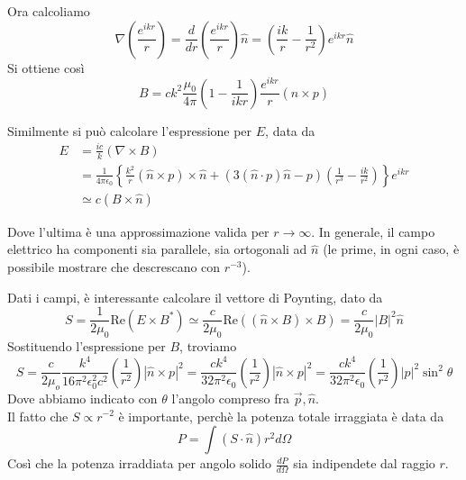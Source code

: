 \documentclass{report}
\begin{document}
            Ora calcoliamo 
            \begin{equation}
                \nabla\left(\frac{e^{ikr}}{r} \right) = \frac{d}{dr}\left(\frac{e^{ikr}}{r} \right)\hat{n} = \left(\frac{ik}{r} - \frac{1}{r^2} \right)e^{ikr}\hat{n}
            \end{equation}
            Si ottiene così 
            \begin{equation}
                B = ck^2 \frac{\mu_0}{4\pi}\left(1 - \frac{1}{ikr} \right)\frac{e^{ikr}}{r}(\hat{n}\times p )
            \end{equation}

            Similmente si può calcolare l'espressione per $E$, data da 
            \begin{align}
                E &= \frac{ic}{k}(\nabla \times B) \\
                &= \frac{1}{4\pi\epsilon_0}\left\{\frac{k^2}{r}(\hat {n}\times p) \times \hat{n} + (3(\hat{n}\cdot p)\hat{n}-p)\left(\frac{1}{r^3}- \frac{ik}{r^2}\right)\right\}e^{ikr} \\
                &\simeq c (B \times \hat{n})
            \end{align}

            Dove l'ultima è una approssimazione valida per \(r \rightarrow \infty\). In generale, il campo elettrico ha componenti sia parallele, sia ortogonali ad \(\hat{n}\) (le prime, in ogni caso, è possibile mostrare che descrescano con \(r^{-3}\)). 


            Dati i campi, è interessante calcolare il vettore di Poynting, dato da 
            \begin{equation}
                S = \frac{1}{2\mu_0}\text{Re}(E\times B^{*}) \simeq \frac{c}{2\mu_0}\text{Re}((\hat{n}\times B)\times B) = \frac{c}{2\mu_0}|B|^2\hat{n}
            \end{equation}
            Sostituendo l'espressione per $B$, troviamo 
            \begin{equation}
                S = \frac{c}{2\mu_o}\frac{k^4}{16\pi^2\epsilon_0^2 c^2}\left( \frac{1}{r^2}\right)|\hat{n}\times p|^2 = \frac{ck^4}{32\pi^2\epsilon_0}\left( \frac{1}{r^2}\right)|\hat{n}\times p|^2 = \frac{ck^4}{32\pi^2\epsilon_0}\left( \frac{1}{r^2}\right)|p|^2 \sin^2 \theta 
            \end{equation}
            Dove abbiamo indicato con \(\theta\) l'angolo compreso fra \(\vec{p}, \hat{n}\). \\
            Il fatto che $S \propto r^{-2}$ è importante, perchè la potenza totale irraggiata è data da 
            \begin{equation}
                P = \int (S\cdot \hat{n})r^2 d\Omega
            \end{equation}
            Così che la potenza irraddiata per angolo solido $\frac{dP}{d\Omega}$ sia indipendete dal raggio $r$. 
\end{document}
